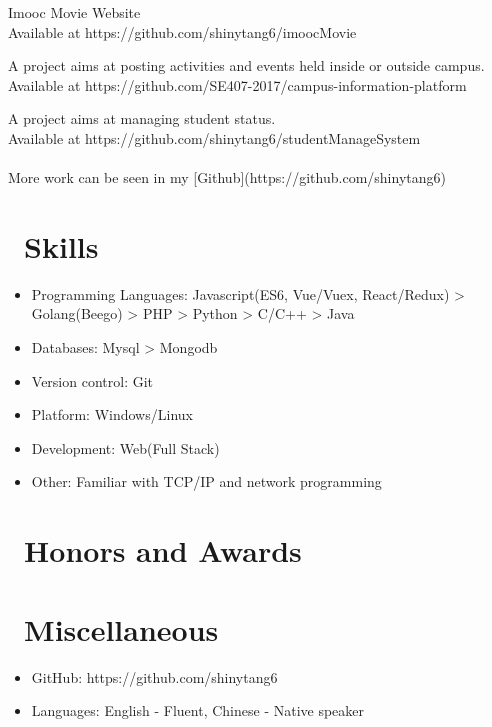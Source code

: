 \documentclass{resume}
\begin{document}
Imooc Movie Website\\
Available at https://github.com/shinytang6/imoocMovie

A project aims at posting activities and events held inside or outside campus.\\
Available at https://github.com/SE407-2017/campus-information-platform

A project aims at managing student status.\\
Available at https://github.com/shinytang6/studentManageSystem
\\
\\
More work can be seen in my [Github](https://github.com/shinytang6)

\section{\faCogs\ Skills}
\begin{itemize}[parsep=0.5ex]
  \item Programming Languages: Javascript(ES6, Vue/Vuex, React/Redux) > Golang(Beego) > PHP > Python > C/C++ > Java
  \item Databases: Mysql > Mongodb
  \item Version control: Git
  \item Platform: Windows/Linux
  \item Development: Web(Full Stack)
  \item Other: Familiar with TCP/IP and network programming
\end{itemize}

\section{\faHeartO\ Honors and Awards}

\section{\faInfo\ Miscellaneous}
\begin{itemize}[parsep=0.5ex]
  \item GitHub: https://github.com/shinytang6
  \item Languages: English - Fluent, Chinese - Native speaker
\end{itemize}

%
%
\end{document}
